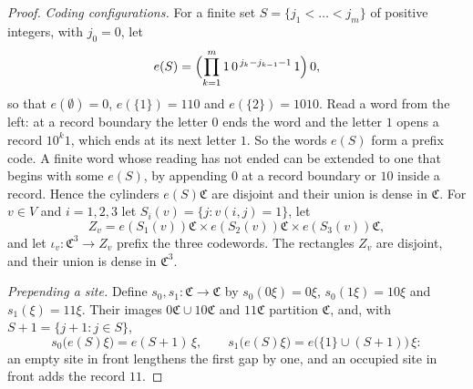 \begin{proof}
\emph{Coding configurations.} For a finite set $S=\{j_1<\dots<j_m\}$ of positive integers, with $j_0=0$, let
\[
e(S)=\Bigl(\prod_{k=1}^m1\,0^{\,j_k-j_{k-1}-1}\,1\Bigr)\,0,
\]
so that $e(\emptyset)=0$, $e(\{1\})=110$ and $e(\{2\})=1010$. Read a word from the left: at a record boundary the letter $0$ ends the word and the
letter $1$ opens a record $10^k1$, which ends at its next letter $1$. So the words $e(S)$ form a prefix code. A finite word whose reading has not
ended can be extended to one that begins with some $e(S)$, by appending $0$ at a record boundary or $10$ inside a record. Hence the cylinders
$e(S)\mathfrak C$ are disjoint and their union is dense in $\mathfrak C$. For $v\in V$ and $i=1,2,3$ let $S_i(v)=\{j:v(i,j)=1\}$, let
\[
Z_v=e(S_1(v))\mathfrak C\times e(S_2(v))\mathfrak C\times e(S_3(v))\mathfrak C ,
\]
and let $\iota_v:\mathfrak C^3\to Z_v$ prefix the three codewords. The rectangles $Z_v$ are disjoint, and their union is dense in $\mathfrak C^3$.

\emph{Prepending a site.} Define $s_0,s_1:\mathfrak C\to\mathfrak C$ by $s_0(0\xi)=0\xi$, $s_0(1\xi)=10\xi$ and $s_1(\xi)=11\xi$. Their images
$0\mathfrak C\cup10\mathfrak C$ and $11\mathfrak C$ partition $\mathfrak C$, and, with $S+1=\{j+1:j\in S\}$,
\begin{equation}\label{eq:prepend}
s_0\bigl(e(S)\xi\bigr)=e(S+1)\,\xi,\qquad s_1\bigl(e(S)\xi\bigr)=e\bigl(\{1\}\cup(S+1)\bigr)\,\xi :
\end{equation}
an empty site in front lengthens the first gap by one, and an occupied site in front adds the record $11$.


\end{proof}
